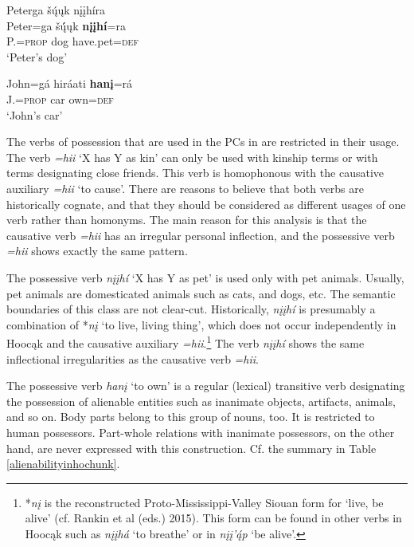 \documentclass[output=paper]{LSP/langsci}
\begin{document}
\ex 
\glll Peterga šų́ųk nįįhíra \\
Peter=ga      šų́́ųk   \textbf{nįįhí}=ra \\
P.=\textsc{prop} dog   have.pet=\textsc{def} \\
\glt `Peter's dog'

\ex \gll John=gá      hiráati \textbf{hanį}=rá \\
J.=\textsc{prop} car       own=\textsc{def} \\
\glt `John's car'

\z \z

The verbs of possession that are used in the PCs in  are restricted in their usage. The verb \textit{=hii} `X has Y as kin' can only be used with kinship terms or with terms designating close friends. This verb is homophonous with the causative auxiliary \textit{=hii} `to cause'. There are reasons to believe that both verbs are historically cognate, and that they should be considered as different usages of one verb rather than homonyms. The main reason for this analysis is that the causative verb \textit{=hii} has an irregular personal inflection, and the possessive verb \textit{=hii} shows exactly the same pattern. 

The possessive verb \textit{nįįh\'i} `X has Y as pet' is used only with pet animals. Usually, pet animals are domesticated animals such as cats, and dogs, etc. The semantic boundaries of this class are not clear-cut. Historically, \textit{nįįhí} is presumably a combination of *\textit{nį} `to live, living thing', which does not occur independently in Hoocąk and the causative auxiliary \textit{=hii}.\footnote{*\textit{n\k{i}} is the reconstructed Proto-Mississippi-Valley Siouan form for `live, be alive' (cf. Rankin et al (eds.) 2015). This form can be found in other verbs in Hooc\k{a}k such as \textit{n\k{i}\k{i}h\'a} `to breathe'  or in \textit{n\k{i}\k{i}'\'{\k{a}}p} `be alive'.} The verb \textit{nįįhí} shows the same inflectional irregularities as the causative verb \textit{=hii}. 

The possessive verb \textit{han\k{i}} `to own' is a regular (lexical) transitive verb designating the possession of alienable entities such as inanimate objects, artifacts, animals, and so on. Body parts belong to this group of nouns, too. It is restricted to human possessors. Part-whole relations with inanimate possessors, on the other hand, are never expressed with this construction. Cf. the summary in Table \ref{alienabilityinhochunk}.
\end{document}
